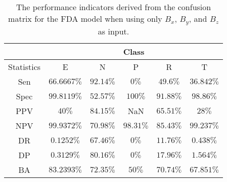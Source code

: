 \begin{table}[!ht]
	\centering
	\begin{tabular}{|c|c|c|c|c|c|}
		\hline
		 & \multicolumn{5}{c|}{Class} \\ \hline
		Statistics & E & N & P & R & T \\ \hline
		Sen & $66.6667\%$ & $92.14\%$ & $0\%$ & $49.6\%$ & $36.842\%$ \\ \hline
		Spec & $99.8119\%$ & $52.57\%$ & $100\%$ & $91.88\%$ & $98.86\%$ \\ \hline
		PPV & $40\%$ & $84.15\%$ & NaN & $65.51\%$ & $28\%$ \\ \hline
		NPV & $99.9372\%$ & $70.98\%$ & $98.31\%$ & $85.43\%$ & $99.237\%$ \\ \hline
		DR & $0.1252\%$ & $67.46\%$ & $0\%$ & $11.76\%$ & $0.438\%$ \\ \hline
		DP & $0.3129\%$ & $80.16\%$ & $0\%$ & $17.96\%$ & $1.564\%$ \\ \hline
		BA & $83.2393\%$ & $72.35\%$ & $50\%$ & $70.74\%$ & $67.851\%$ \\ \hline
	\end{tabular}
	\caption{The performance indicators derived from the confusion matrix for the FDA model when using only $B_{x}$, $B_{y}$, and $B_{z}$ as input.}
	\label{tab:cs:reverse:coord:fda}
\end{table}
